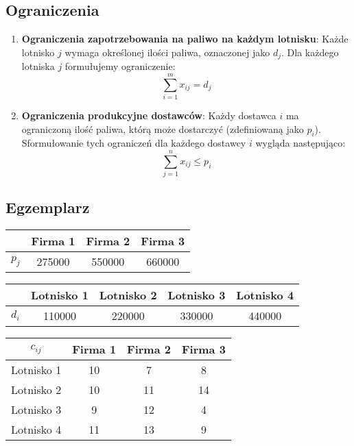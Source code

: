 \documentclass[12pt, letterpaper]{article}
\begin{document}
\subsection{Ograniczenia}
\begin{enumerate}
  \item \textbf{Ograniczenia zapotrzebowania na paliwo na każdym lotnisku}:
        Każde lotnisko \( j \) wymaga określonej ilości paliwa, oznaczonej jako
        \( d_j
        \). Dla każdego lotniska \( j \) formułujemy ograniczenie:
        \[
          \sum_{i=1}^m x_{ij} = d_j
        \]

  \item \textbf{Ograniczenia produkcyjne dostawców}: Każdy dostawca \( i \)
        ma ograniczoną ilość paliwa, którą może dostarczyć (zdefiniowaną jako
        \( p_i
        \)). Sformułowanie tych ograniczeń dla każdego dostawcy \( i \) wygląda
        następująco:
        \[
          \sum_{j=1}^n x_{ij} \leq p_i
        \]
\end{enumerate}

\subsection{Egzemplarz}
\begin{center}
  \begin{tabular}{|c|c|c|c|}
    \hline
              & Firma 1 & Firma 2 & Firma 3 \\
    \hline
    \( p_j \) & 275000  & 550000  & 660000  \\
    \hline
  \end{tabular}
\end{center}

\begin{center}
  \begin{tabular}{|c|c|c|c|c|}
    \hline
              & Lotnisko 1 & Lotnisko 2 & Lotnisko 3 & Lotnisko 4 \\
    \hline
    \( d_i \) & 110000     & 220000     & 330000     & 440000     \\
    \hline
  \end{tabular}
\end{center}

\begin{center}
  \begin{tabular}{|c|c|c|c|}
    \hline
    \( c_{ij} \) & Firma 1 & Firma 2 & Firma 3 \\
    \hline
    Lotnisko 1   & 10      & 7       & 8       \\
    Lotnisko 2   & 10      & 11      & 14      \\
    Lotnisko 3   & 9       & 12      & 4       \\
    Lotnisko 4   & 11      & 13      & 9       \\
    \hline
  \end{tabular}
\end{center}
\end{document}
